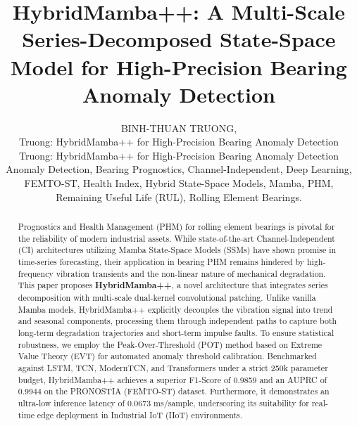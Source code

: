 \documentclass{ieeeaccess}
\begin{document}

\title{HybridMamba++: A Multi-Scale Series-Decomposed State-Space Model for High-Precision Bearing Anomaly Detection}
\author{\uppercase{Binh-Thuan Truong},
\address[1]{Faculty of Information Technology, Ton Duc Thang University, Ho Chi Minh City, Vietnam}

\markboth
{Truong: HybridMamba++ for High-Precision Bearing Anomaly Detection}
{Truong: HybridMamba++ for High-Precision Bearing Anomaly Detection}


\begin{abstract}
Prognostics and Health Management (PHM) for rolling element bearings is pivotal for the reliability of modern industrial assets. While state-of-the-art Channel-Independent (CI) architectures utilizing Mamba State-Space Models (SSMs) have shown promise in time-series forecasting, their application in bearing PHM remains hindered by high-frequency vibration transients and the non-linear nature of mechanical degradation. This paper proposes \textbf{HybridMamba++}, a novel architecture that integrates series decomposition with multi-scale dual-kernel convolutional patching. Unlike vanilla Mamba models, HybridMamba++ explicitly decouples the vibration signal into trend and seasonal components, processing them through independent paths to capture both long-term degradation trajectories and short-term impulse faults. To ensure statistical robustness, we employ the Peak-Over-Threshold (POT) method based on Extreme Value Theory (EVT) for automated anomaly threshold calibration. Benchmarked against LSTM, TCN, ModernTCN, and Transformers under a strict 250k parameter budget, HybridMamba++ achieves a superior F1-Score of 0.9859 and an AUPRC of 0.9944 on the PRONOSTIA (FEMTO-ST) dataset. Furthermore, it demonstrates an ultra-low inference latency of 0.0673 ms/sample, underscoring its suitability for real-time edge deployment in Industrial IoT (IIoT) environments.
\end{abstract}

\begin{keywords}
Anomaly Detection, Bearing Prognostics, Channel-Independent, Deep Learning, FEMTO-ST, Health Index, Hybrid State-Space Models, Mamba, PHM, Remaining Useful Life (RUL), Rolling Element Bearings.
\end{keywords}

}
\end{document}
